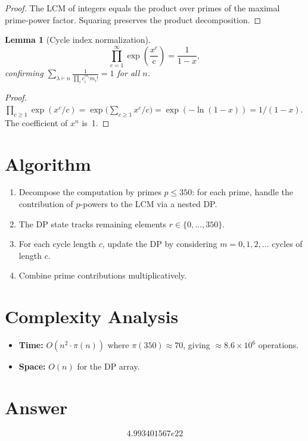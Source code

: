 \documentclass[12pt]{article}
\newtheorem{lemma}[theorem]{Lemma}
\begin{document}
\begin{proof}
The LCM of integers equals the product over primes of the maximal prime-power factor. Squaring preserves the product decomposition.
\end{proof}

\begin{lemma}[Cycle index normalization]
\[
\prod_{c=1}^{\infty}\exp\!\left(\frac{x^c}{c}\right) = \frac{1}{1-x},
\]
confirming $\sum_{\lambda\vdash n} \frac{1}{\prod_i c_i^{m_i}m_i!} = 1$ for all $n$.
\end{lemma}

\begin{proof}
$\prod_{c\ge 1}\exp(x^c/c) = \exp\bigl(\sum_{c\ge 1}x^c/c\bigr) = \exp(-\ln(1-x)) = 1/(1-x)$. The coefficient of $x^n$ is~1.
\end{proof}

\section{Algorithm}
\begin{enumerate}
\item Decompose the computation by primes $p \le 350$: for each prime, handle the contribution of $p$-powers to the LCM via a nested DP.
\item The DP state tracks remaining elements $r \in \{0, \ldots, 350\}$.
\item For each cycle length $c$, update the DP by considering $m = 0, 1, 2, \ldots$ cycles of length $c$.
\item Combine prime contributions multiplicatively.
\end{enumerate}

\section{Complexity Analysis}
\begin{itemize}
\item \textbf{Time:} $O(n^2 \cdot \pi(n))$ where $\pi(350)\approx 70$, giving $\approx 8.6\times 10^6$ operations.
\item \textbf{Space:} $O(n)$ for the DP array.
\end{itemize}

\section{Answer}

\[
\boxed{4.993401567e22}
\]
\end{document}
